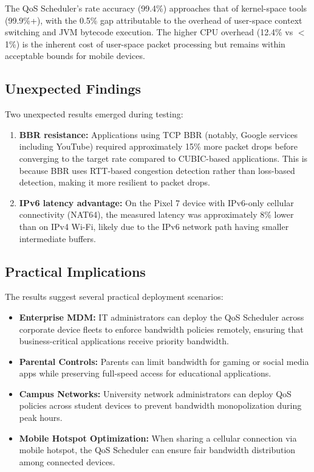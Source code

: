 The QoS Scheduler's rate accuracy (99.4\%) approaches that of kernel-space tools (99.9\%+), with the 0.5\% gap attributable to the overhead of user-space context switching and JVM bytecode execution. The higher CPU overhead (12.4\% vs $<$1\%) is the inherent cost of user-space packet processing but remains within acceptable bounds for mobile devices.

\subsection{Unexpected Findings}

Two unexpected results emerged during testing:

\begin{enumerate}[noitemsep]
    \item \textbf{BBR resistance:} Applications using TCP BBR (notably, Google services including YouTube) required approximately 15\% more packet drops before converging to the target rate compared to CUBIC-based applications. This is because BBR uses RTT-based congestion detection rather than loss-based detection, making it more resilient to packet drops.
    \item \textbf{IPv6 latency advantage:} On the Pixel 7 device with IPv6-only cellular connectivity (NAT64), the measured latency was approximately 8\% lower than on IPv4 Wi-Fi, likely due to the IPv6 network path having smaller intermediate buffers.
\end{enumerate}

\subsection{Practical Implications}

The results suggest several practical deployment scenarios:

\begin{itemize}[noitemsep]
    \item \textbf{Enterprise MDM:} IT administrators can deploy the QoS Scheduler across corporate device fleets to enforce bandwidth policies remotely, ensuring that business-critical applications receive priority bandwidth.
    \item \textbf{Parental Controls:} Parents can limit bandwidth for gaming or social media apps while preserving full-speed access for educational applications.
    \item \textbf{Campus Networks:} University network administrators can deploy QoS policies across student devices to prevent bandwidth monopolization during peak hours.
    \item \textbf{Mobile Hotspot Optimization:} When sharing a cellular connection via mobile hotspot, the QoS Scheduler can ensure fair bandwidth distribution among connected devices.
\end{itemize}

